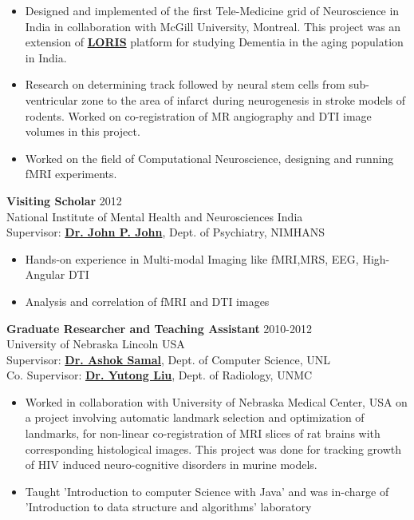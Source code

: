 \documentclass[line, margin]{res}
\begin{document}
\begin{resume}
\begin{itemize}
    \item Designed and implemented of the first Tele-Medicine grid of Neuroscience in India in collaboration with McGill University, Montreal. This project was an extension of \href{http://mcin-cnim.ca/neuroimagingtechnologies/loris/}{\textbf{LORIS}} platform for studying Dementia in the aging population in India. 
    \item Research on determining track followed by neural stem cells from sub-ventricular zone to the area of infarct during neurogenesis in stroke models of rodents. Worked on co-registration of MR angiography and DTI image volumes in this project.
    \item Worked on the field of Computational Neuroscience, designing and running fMRI experiments.
\end{itemize}



\textbf{Visiting Scholar} \hfill 2012\\
National Institute of Mental Health and Neurosciences \hfill India\\
Supervisor: \href{http://mbial.weebly.com/dr-john-p-john.html}{\textbf{Dr. John P. John}}, Dept. of Psychiatry, NIMHANS
\begin{itemize}
    \item Hands-on experience in Multi-modal Imaging like fMRI,MRS, EEG, High-Angular DTI
    \item Analysis and correlation of fMRI and DTI images
\end{itemize}



\textbf{Graduate Researcher and Teaching Assistant} \hfill 2010-2012\\
University of Nebraska Lincoln \hfill USA\\
Supervisor: \href{http://cse.unl.edu/~samal/}{\textbf{Dr. Ashok Samal}}, Dept. of Computer Science, UNL\\
Co. Supervisor: \href{http://www.unmc.edu/radiology/faculty/liu.html}{\textbf{Dr. Yutong Liu}}, Dept. of Radiology, UNMC

\begin{itemize}
    \item Worked in collaboration with University of Nebraska Medical Center, USA on a project involving automatic landmark selection and optimization of landmarks, for non-linear co-registration of MRI slices of rat brains with corresponding histological images. This project was done for tracking growth of HIV induced neuro-cognitive disorders in murine models.
    \item Taught 'Introduction to computer Science with Java' and was in-charge of 'Introduction to data structure and algorithms' laboratory
\end{itemize}



\end{resume}
\end{document}
